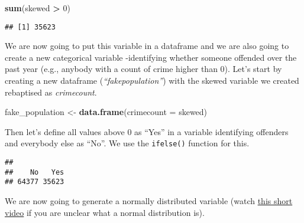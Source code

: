 \documentclass[
]{book}
\newenvironment{Shaded}{\begin{snugshade}}{\end{snugshade}}
\newcommand{\AttributeTok}[1]{\textcolor[rgb]{0.13,0.29,0.53}{#1}}
\newcommand{\CommentTok}[1]{\textcolor[rgb]{0.56,0.35,0.01}{\textit{#1}}}
\newcommand{\DecValTok}[1]{\textcolor[rgb]{0.00,0.00,0.81}{#1}}
\newcommand{\FunctionTok}[1]{\textcolor[rgb]{0.13,0.29,0.53}{\textbf{#1}}}
\newcommand{\NormalTok}[1]{#1}
\newcommand{\OtherTok}[1]{\textcolor[rgb]{0.56,0.35,0.01}{#1}}
\newcommand{\SpecialCharTok}[1]{\textcolor[rgb]{0.81,0.36,0.00}{\textbf{#1}}}
\newcommand{\StringTok}[1]{\textcolor[rgb]{0.31,0.60,0.02}{#1}}
\begin{document}
\begin{Shaded}
\begin{Highlighting}[]
\FunctionTok{sum}\NormalTok{(skewed }\SpecialCharTok{\textgreater{}} \DecValTok{0}\NormalTok{)}
\end{Highlighting}
\end{Shaded}

\begin{verbatim}
## [1] 35623
\end{verbatim}

We are now going to put this variable in a dataframe and we are also going to create a new categorical variable -identifying whether someone offended over the past year (e.g., anybody with a count of crime higher than 0). Let's start by creating a new dataframe (\emph{``fakepopulation''}) with the skewed variable we created rebaptised as \emph{crimecount}.

\begin{Shaded}
\begin{Highlighting}[]
\NormalTok{fake\_population }\OtherTok{\textless{}{-}} \FunctionTok{data.frame}\NormalTok{(}\AttributeTok{crimecount =}\NormalTok{ skewed)}
\end{Highlighting}
\end{Shaded}

Then let's define all values above 0 as ``Yes'' in a variable identifying offenders and everybody else as ``No''. We use the \texttt{ifelse()} function for this.

\begin{Shaded}
\end{Shaded}

\begin{verbatim}
## 
##    No   Yes 
## 64377 35623
\end{verbatim}

We are now going to generate a normally distributed variable (watch \href{https://www.youtube.com/watch?v=mtH1fmUVkfE}{this short video} if you are unclear what a normal distribution is).
\end{document}
